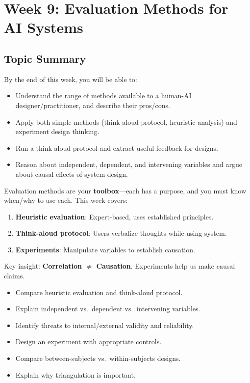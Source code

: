 \section{Week 9: Evaluation Methods for AI Systems}

\subsection{Topic Summary}

\begin{keybox}
By the end of this week, you will be able to:
\begin{itemize}
  \item Understand the range of methods available to a human-AI designer/practitioner, and describe their pros/cons.
  \item Apply both simple methods (think-aloud protocol, heuristic analysis) and experiment design thinking.
  \item Run a think-aloud protocol and extract useful feedback for designs.
  \item Reason about independent, dependent, and intervening variables and argue about causal effects of system design.
\end{itemize}
\end{keybox}

\begin{keybox}
Evaluation methods are your \textbf{toolbox}---each has a purpose, and you must know when/why to use each. This week covers:
\begin{enumerate}
  \item \textbf{Heuristic evaluation}: Expert-based, uses established principles.
  \item \textbf{Think-aloud protocol}: Users verbalize thoughts while using system.
  \item \textbf{Experiments}: Manipulate variables to establish causation.
\end{enumerate}

Key insight: \textbf{Correlation $\neq$ Causation}. Experiments help us make causal claims.
\end{keybox}

\begin{keybox}
\begin{itemize}
  \item Compare heuristic evaluation and think-aloud protocol.
  \item Explain independent vs.\ dependent vs.\ intervening variables.
  \item Identify threats to internal/external validity and reliability.
  \item Design an experiment with appropriate controls.
  \item Compare between-subjects vs.\ within-subjects designs.
  \item Explain why triangulation is important.
\end{itemize}
\end{keybox}


